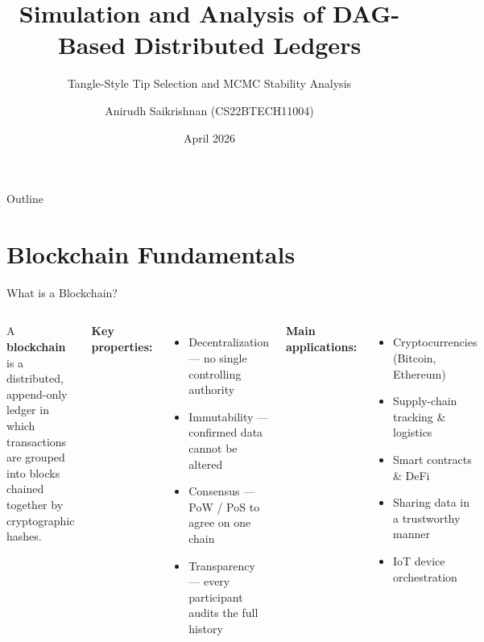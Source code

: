 \documentclass[aspectratio=169]{beamer}
\title[DAG-Based Distributed Ledgers]{Simulation and Analysis of DAG-Based Distributed Ledgers}
\subtitle{Tangle-Style Tip Selection and MCMC Stability Analysis}
\author[Anirudh S.]{Anirudh Saikrishnan (CS22BTECH11004)}
\institute[IITH]{Department of Computer Science \& Engineering\\Indian Institute of Technology Hyderabad}
\date{April 2026}
\begin{document}
\begin{frame}
  \titlepage
\end{frame}

\begin{frame}{Outline}
  \tableofcontents
\end{frame}

\section{Blockchain Fundamentals}

\begin{frame}{What is a Blockchain?}
  \begin{columns}[T]
    A \textbf{blockchain} is a distributed, append-only ledger in which transactions are grouped into blocks chained together by cryptographic hashes.

    \bigskip
    \textbf{Key properties:}
    \begin{itemize}
      \item Decentralization --- no single controlling authority
      \item Immutability --- confirmed data cannot be altered
      \item Consensus --- PoW / PoS to agree on one chain
      \item Transparency --- every participant audits the full history
    \end{itemize}

    \textbf{Main applications:}
    \begin{itemize}
      \item Cryptocurrencies (Bitcoin, Ethereum)
      \item Supply-chain tracking \& logistics
      \item Smart contracts \& DeFi
      \item Sharing data in a trustworthy manner
      \item IoT device orchestration
    \end{itemize}
  \end{columns}
\end{frame}
\end{document}
